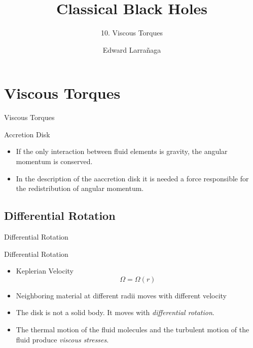 \documentclass{beamer}
\title{Classical Black Holes} %
\subtitle{10. Viscous Torques  } %
\author{Edward Larra\~{n}aga}
\begin{document}
\frame{\maketitle}


\section{Viscous Torques}
\begin{frame}
\Huge
Viscous Torques
\end{frame}

\begin{frame}{Accretion Disk}
	\begin{itemize}
	\item If the only interaction between fluid elements is gravity, the angular momentum is conserved.
	\pause
	\item In the description of the aaccretion disk it is needed a force responsible for the redistribution of angular momentum.
	\end{itemize}
\end{frame}

\subsection{Differential Rotation}
\begin{frame}
\Huge
Differential Rotation
\end{frame}

\begin{frame}{Differential Rotation}
	\begin{itemize}
	\item Keplerian Velocity
	\[ \Omega = \Omega (r)\]
	\pause
	\item Neighboring material at different radii moves with different velocity
	\pause
	\item The disk is not a solid body. It moves with \textit{differential rotation}.
	\pause
	\item The thermal motion of the fluid molecules and the turbulent motion of the fluid produce \textit{viscous stresses}.
	\end{itemize}
\end{frame}
\end{document}
